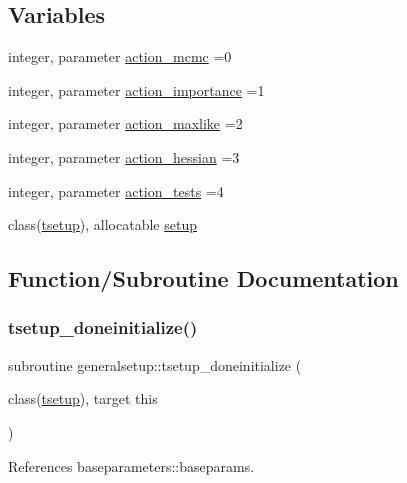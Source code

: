 \subsection*{Variables}
\begin{DoxyCompactItemize}
\item 
integer, parameter \mbox{\hyperlink{namespacegeneralsetup_aa1fe7f09863579dea11fff2b498ea035}{action\+\_\+mcmc}} =0
\item 
integer, parameter \mbox{\hyperlink{namespacegeneralsetup_a8c2cc6dc22ec2b32558f1d3f478f835b}{action\+\_\+importance}} =1
\item 
integer, parameter \mbox{\hyperlink{namespacegeneralsetup_a7aa42a6a8502a7f927b5eef1f7c968b7}{action\+\_\+maxlike}} =2
\item 
integer, parameter \mbox{\hyperlink{namespacegeneralsetup_a4e469d33113eb48f19cfd83d113bab5c}{action\+\_\+hessian}} =3
\item 
integer, parameter \mbox{\hyperlink{namespacegeneralsetup_a6f10f3082af438a30e6188d4b75666de}{action\+\_\+tests}} =4
\item 
class(\mbox{\hyperlink{structgeneralsetup_1_1tsetup}{tsetup}}), allocatable \mbox{\hyperlink{namespacegeneralsetup_a9910f6f4ebbc88805bed3c999d7ce459}{setup}}
\end{DoxyCompactItemize}


\subsection{Function/\+Subroutine Documentation}
\mbox{\label{namespacegeneralsetup_acfe3cccd27f6794ef55ded35c5a7e63b}} 
\subsubsection{\texorpdfstring{tsetup\+\_\+doneinitialize()}{tsetup\_doneinitialize()}}
{\footnotesize\ttfamily subroutine generalsetup\+::tsetup\+\_\+doneinitialize (\begin{DoxyParamCaption}\item[{class(\mbox{\hyperlink{structgeneralsetup_1_1tsetup}{tsetup}}), target}]{this }\end{DoxyParamCaption})}



References baseparameters\+::baseparams.

